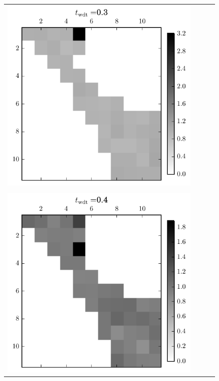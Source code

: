 \begin{figure}[h]
\begin{tabular}{cccc}
    \includegraphics[scale=0.75]{images/results/matshows/homog_sp0_matshow_2}
    \\
     & \\
    \includegraphics[scale=0.75]{images/results/matshows/homog_sp0_matshow_3}

\end{tabular}
\end{figure}
